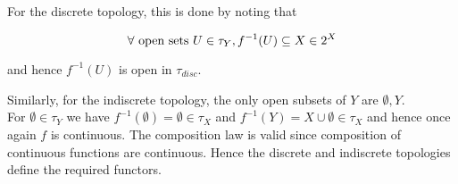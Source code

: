 \begin{frame}
    
 For the discrete topology, this is done by noting that 
 
 \begin{equation}
    \forall \textnormal{ open sets } U \in \tau_Y , f^{-1} (U) \subseteq X \in 2^X
 \end{equation}

    and hence \(f^{-1}(U)\) is open in \(\tau_{disc}\). 

    
  Similarly, for the indiscrete topology, the only open subsets of \(Y\) are
    \({\emptyset,Y}\).  \\ For \(\emptyset \in \tau_Y\) we have
    \(f^{-1}(\emptyset) = \emptyset \in \tau_X \) and \(f^{-1}(Y) = X \cup
    \emptyset \in \tau_X \)  %
and hence once again \(f\) is continuous. The composition law is valid since
composition of continuous functions are continuous. Hence the discrete and
indiscrete topologies define the required functors. 

\end{frame}

